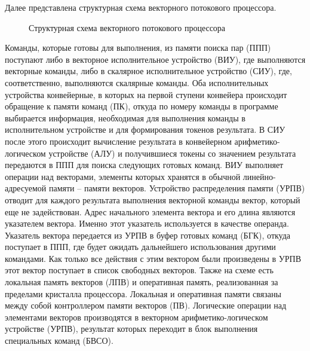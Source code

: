 \documentclass[
11pt,%
tightenlines,%
twoside,%
onecolumn,%
nofloats,%
nobibnotes,%
nofootinbib,%
superscriptaddress,%
noshowpacs,%
centertags]%
{revtex4}
\begin{document}
Далее представлена структурная схема векторного потокового процессора.

\begin{figure}[h!]
\setcaptionmargin{5mm}
\onelinecaptionsfalse
{}
\caption{Структурная схема векторного потокового процессора}
\label{vpp-scheme}
\end{figure}

Команды, которые готовы для выполнения, из памяти поиска пар (ППП) поступают либо в векторное исполнительное устройство (ВИУ), где выполняются векторные команды, либо в скалярное исполнительное устройство (СИУ), где, соответственно, выполняются скалярные команды. Оба исполнительных устройства конвейерные, в которых на первой ступени конвейера происходит обращение к памяти команд (ПК), откуда по номеру команды в программе выбирается информация, необходимая для выполнения команды в исполнительном устройстве и для формирования токенов результата.
В СИУ после этого происходит вычисление результата в конвейерном арифметико-логическом устройстве (АЛУ) и получившиеся токены со значением результата передаются в ППП для поиска следующих готовых команд.
ВИУ выполняет операции над векторами, элементы которых хранятся в обычной линейно-адресуемой памяти – памяти векторов. Устройство распределения памяти (УРПВ) отводит для каждого результата выполнения векторной команды вектор, который еще не задействован. Адрес начального элемента вектора и его длина являются указателем вектора. Именно этот указатель используется в качестве операнда. Указатель вектора передается из УРПВ в буфер готовых команд (БГК), откуда поступает в ППП, где будет ожидать дальнейшего использования другими командами. Как только все действия с этим вектором были произведены в УРПВ этот вектор поступает в список свободных векторов.
Также на схеме есть локальная память векторов (ЛПВ) и оперативная память, реализованная за пределами кристалла процессора. Локальная и оперативная памяти связаны между собой контроллером памяти векторов (ПВ). Логические операции над элементами векторов производятся в векторном арифметико-логическом устройстве (УРПВ), результат которых переходит в блок выполнения специальных команд (БВСО). 
\end{document}
